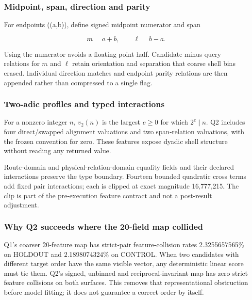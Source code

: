 \subsubsection{Midpoint, span, direction and
parity}\label{viii-ch07-midpoint-span-direction-and-parity}

For endpoints ((a,b)), define signed midpoint numerator and span

\[
m=a+b,
\qquad
\ell=b-a.
\]

Using the numerator avoids a floating-point half. Candidate-minus-query
relations for \(m\) and \(\ell\) retain orientation and separation that
coarse shell bins erased. Individual direction matches and endpoint
parity relations are then appended rather than compressed to a single
flag.

\subsubsection{Two-adic profiles and typed
interactions}\label{viii-ch07-two-adic-profiles-and-typed-interactions}

For a nonzero integer \(n\), \(v_2(n)\) is the largest \(e\ge0\) for
which \(2^e\mid n\). Q2 includes four direct/swapped alignment
valuations and two span-relation valuations, with the frozen convention
for zero. These features expose dyadic shell structure without reading
any returned value.

Route-domain and physical-relation-domain equality fields and their
declared interactions preserve the type boundary. Fourteen bounded
quadratic cross terms add fixed pair interactions; each is clipped at
exact magnitude 16,777,215. The clip is part of the pre-execution
feature contract and not a post-result adjustment.

\subsubsection{Why Q2 succeeds where the 20-field map
collided}\label{viii-ch07-why-q2-succeeds-where-the-20-field-map-collided}

Q1's coarser 20-feature map has strict-pair feature-collision rates
2.3255657565\% on HOLDOUT and 2.1898074324\% on CONTROL. When two
candidates with different target order have the same visible vector, any
deterministic linear score must tie them. Q2's signed, unbinned and
reciprocal-invariant map has zero strict feature collisions on both
surfaces. This removes that representational obstruction before model
fitting; it does not guarantee a correct order by itself.

